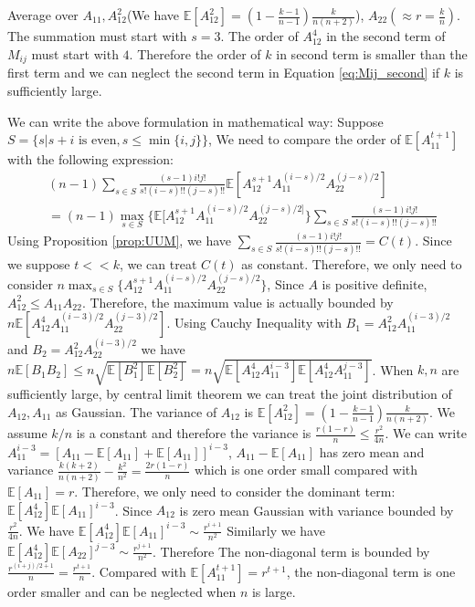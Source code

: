 \documentclass{article}
\def\E{\mathbb{E}}
\begin{document}
Average over $A_{11}, A^2_{12}$(We have $\E[A^2_{12}]= (1-\frac{k-1}{n-1})\frac{k}{n(n+2)}$),
$A_{22}(\approx r = \frac{k}{n})$.
The summation must start with $s=3$.
The order of $A_{12}^4$ in
the second term of $M_{ij}$ must start with $4$.
Therefore the order of $k$ in second term is smaller than
the first term and we can neglect the second term in Equation \eqref{eq:Mij_second}
if $k$ is sufficiently large.

We can write the above formulation in mathematical way:
Suppose $S=\{s| s+i \textrm{ is even}, s\leq \min\{i,j\} \}$,
We need to compare the order of $\E[A_{11}^{t+1}]$ with the following expression:
\begin{align*}
&(n-1) \sum_{s \in S}
\frac{(s-1)i!j!}{s!(i-s)!!(j-s)!!}
\E[A_{12}^{s+1} A_{11}^{(i - s) /2}A_{22}^{(j - s)/2}]\\
&=(n-1) \max_{s\in S}\{\E[A_{12}^{s+1} A_{11}^{(i - s) /2}A_{22}^{(j - s)/2]}\}\sum_{s \in S}
\frac{(s-1)i!j!}{s!(i-s)!!(j-s)!!}
\end{align*}
Using Proposition \ref{prop:UUM}, we have 
$\sum_{s \in S}
\frac{(s-1)i!j!}{s!(i-s)!!(j-s)!!} = C(t)$. Since we suppose $t << k$, we can treat $C(t)$ as constant.
Therefore, we only need to consider $n\max_{s\in S}\{A_{12}^{s+1} A_{11}^{(i- s) /2}A_{22}^{(j- s)/2}\}$,
Since $A$ is positive definite, $A_{12}^2 \leq A_{11}A_{22}$. Therefore, the maximum value is actually bounded by
$n \E[A_{12}^4 A_{11}^{(i-3)/2} A_{22}^{(j-3)/2}]$.
Using Cauchy Inequality with $B_1 = A_{12}^2 A_{11}^{(i-3)/2}$ and $B_2 = A_{12}^2 A_{22}^{(i-3)/2}$ we have $n\E[B_1B_2] \leq n \sqrt{\E[B_1^2] \E[B_2^2]} = n  \sqrt{\E[ A_{12}^4 A_{11}^{i-3} ]\E[ A_{12}^4 A_{11}^{j-3} ]}$.
When $k, n$ are sufficiently large, by central limit theorem we can treat the joint distribution of $A_{12}, A_{11}$ as Gaussian.
The variance of $A_{12}$ is $\E[A^2_{12}]=(1-\frac{k-1}{n-1}) \frac{k}{n(n+2)}$. We assume $k/n$ is a constant and therefore the variance is $\frac{r(1-r)}{n} \leq \frac{r^2}{4n}$.
We can write $A_{11}^{i-3} = [A_{11} - \E[A_{11}] + \E[A_{11}]]^{i-3}$, $A_{11} - \E[A_{11}]$ has zero mean and variance $\frac{k(k+2)}{n(n+2)} - \frac{k^2}{n^2} = \frac{2r(1-r)}{n}$ which is one order small compared with $\E[A_{11}] = r$.
Therefore, we only need to consider the dominant term: $\E[A^4_{12}]\E[A_{11}]^{i-3}$. Since $A_{12}$ is zero mean Gaussian with variance bounded by $\frac{r^2}{4n}$.  We have $ \E[A^4_{12}]\E[A_{11}]^{i-3} \sim \frac{r^{i+1}}{n^2}$ Similarly we have $ \E[A^4_{12}]\E[A_{22}]^{j-3} \sim \frac{r^{j+1}}{n^2}$. Therefore
The non-diagonal term is bounded by $\frac{r^{(i+j)/2+1}}{n} = \frac{r^{t+1}}{n}$. Compared with $\E[A_{11}^{t+1}] = r^{t+1}$, the non-diagonal term is one order smaller and can be neglected when $n$ is large. 
\end{document}

